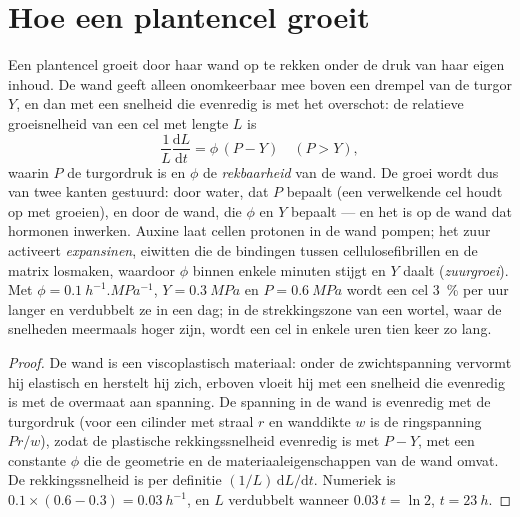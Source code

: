 \section{Hoe een plantencel groeit}

\begin{theorem}\label{thm:b2:plant-meristems:lockhart}
Een plantencel groeit door haar wand op te rekken onder de druk van haar
eigen inhoud. De wand geeft alleen onomkeerbaar mee boven een drempel van de
turgor $Y$, en dan met een snelheid die evenredig is met het overschot: de
relatieve groeisnelheid van een cel met lengte $L$ is
\[
\frac{1}{L}\frac{\mathrm{d}L}{\mathrm{d}t} = \phi\,(P - Y) \quad (P > Y),
\]
waarin $P$ de turgordruk is en $\phi$ de \emph{rekbaarheid} van de wand. De
groei wordt dus van twee kanten gestuurd: door water, dat $P$ bepaalt (een
verwelkende cel houdt op met groeien), en door de wand, die $\phi$ en $Y$
bepaalt --- en het is op de wand dat hormonen inwerken. Auxine laat cellen
protonen in de wand pompen; het zuur activeert \emph{expansinen}, eiwitten
die de bindingen tussen cellulosefibrillen en de matrix losmaken, waardoor
$\phi$ binnen enkele minuten stijgt en $Y$ daalt (\emph{zuurgroei}). Met
$\phi =
\qty{0.1}{h^{-1}.MPa^{-1}}$, $Y = \qty{0.3}{MPa}$ en $P =
\qty{0.6}{MPa}$ wordt een cel \qty{3}{\%} per uur langer en verdubbelt ze in
een dag; in de strekkingszone van een wortel, waar de snelheden meermaals
hoger zijn, wordt een cel in enkele uren tien keer zo lang.
\end{theorem}
\begin{proof}
De wand is een viscoplastisch materiaal: onder de zwichtspanning vervormt
hij elastisch en herstelt hij zich, erboven vloeit hij met een snelheid die
evenredig is met de overmaat aan spanning. De spanning in de wand is
evenredig met de turgordruk (voor een cilinder met straal $r$ en wanddikte
$w$ is de ringspanning $Pr/w$), zodat de plastische rekkingssnelheid
evenredig is met $P - Y$, met een constante $\phi$ die de geometrie en de
materiaaleigenschappen van de wand omvat. De rekkingssnelheid is per
definitie $(1/L)\,\mathrm{d}L/\mathrm{d}t$. Numeriek is
$0.1\times(0.6 - 0.3) = \qty{0.03}{h^{-1}}$, en $L$ verdubbelt wanneer
$0.03\,t = \ln 2$, $t = \qty{23}{h}$.
\end{proof}

